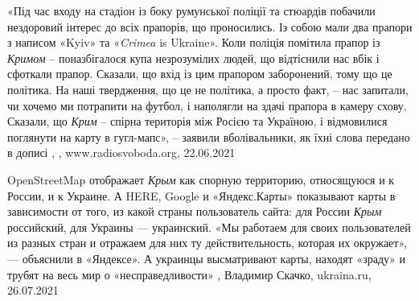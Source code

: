 «Під час входу на стадіон із боку румунської поліції та стюардів побачили
нездоровий інтерес до всіх прапорів, що проносились. Із собою мали два прапори
з написом «Kyiv» та «\emph{Crimea} is Ukraine». Коли поліція помітила прапор із
\emph{Кримом} – поназбігалося купа незрозумілих людей, що відтіснили нас вбік і
сфоткали прапор. Сказали, що вхід із цим прапором заборонений, тому що це
політика. На наші твердження, що це не політика, а просто факт, – нас запитали,
чи хочемо ми потрапити на футбол, і наполягли на здачі прапора в камеру схову.
Сказали, що \emph{Крим} – спірна територія між Росією та Україною, і відмовилися
поглянути на карту в гугл-мапс», – заявили вболівальники, як їхні слова
передано в дописі
, 
, www.radiosvoboda.org, 22.06.2021

OpenStreetMap отображает \emph{Крым} как спорную территорию, относящуюся и к России, и
к Украине. А HERE, Google и «Яндекс.Карты» показывают карты в зависимости от
того, из какой страны пользователь сайта: для России \emph{Крым} российский, для
Украины — украинский. «Мы работаем для своих пользователей из разных стран и
отражаем для них ту действительность, которая их окружает», — объяснили в
«Яндексе». А украинцы высматривают карты, находят «зраду» и трубят на весь мир
о «несправедливости»
, 
Владимир Скачко, ukraina.ru, 26.07.2021

